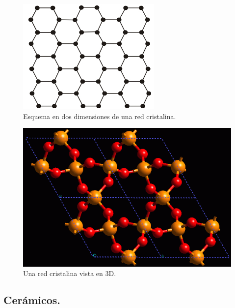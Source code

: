 \documentclass[12pt]{article}
\begin{document}
\begin{figure}[H]
    \centering
    \includegraphics[scale=1]{Imagenes/Piezoelectricidad_01.png}
    \caption{Esquema en dos dimensiones de una red cristalina.}
\end{figure}
\begin{figure}[H]
    \centering
    \includegraphics[scale=0.6]{Imagenes/Piezoelectricidad_02.png}
    \caption{Una red cristalina vista en 3D.}
\end{figure}


\subsection{Cerámicos.}
\end{document}
